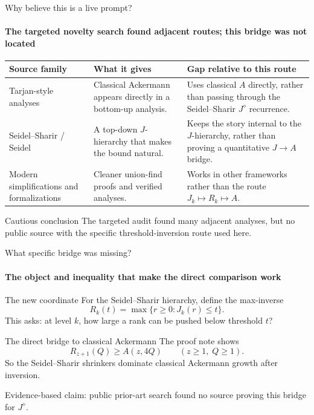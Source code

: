 \documentclass[aspectratio=169,11pt]{beamer}
\begin{document}
\begin{frame}{Why believe this is a live prompt?}
\framesubtitle{The targeted novelty search found adjacent routes; this bridge was not located}
\small
\begin{center}
\begin{tabular}{>{\raggedright\arraybackslash}p{}>{\raggedright\arraybackslash}p{}>{\raggedright\arraybackslash}p{}}
\toprule
\textbf{Source family} & \textbf{What it gives} & \textbf{Gap relative to this route}\\
\midrule
Tarjan-style analyses & Classical Ackermann appears directly in a bottom-up analysis. & Uses classical $A$ directly, rather than passing through the Seidel--Sharir $J^\diamond$ recurrence.\\[0.10cm]
Seidel--Sharir / Seidel & A top-down $J$-hierarchy that makes the bound natural. & Keeps the story internal to the $J$-hierarchy, rather than proving a quantitative $J\to A$ bridge.\\[0.10cm]
Modern simplifications and formalizations & Cleaner union-find proofs and verified analyses. & Works in other frameworks rather than the route $J_k\mapsto R_k\mapsto A$.\\
\bottomrule
\end{tabular}
\end{center}
\vspace{0.25cm}
\begin{block}{Cautious conclusion}
The targeted audit found many adjacent analyses, but no public source with the specific threshold-inversion route used here.
\end{block}
\end{frame}

\begin{frame}{What specific bridge was missing?}
\framesubtitle{The object and inequality that make the direct comparison work}
\begin{block}{The new coordinate}
For the Seidel--Sharir hierarchy, define the max-inverse
\[
  R_k(t)=\max\{r\ge 0:J_k(r)\le t\}.
\]
This asks: at level $k$, how large a rank can be pushed below threshold $t$?
\end{block}
\vspace{0.15cm}
\begin{block}{The direct bridge to classical Ackermann}
The proof note shows
\[
  R_{z+1}(Q)\ge A(z,4Q)
  \qquad (z\ge 1,\; Q\ge 1).
\]
So the Seidel--Sharir shrinkers dominate classical Ackermann growth after inversion.
\end{block}
\vspace{0.1cm}
\begin{center}
\small Evidence-based claim: public prior-art search found no source proving this bridge for $J^\diamond$.
\end{center}
\end{frame}
\end{document}
